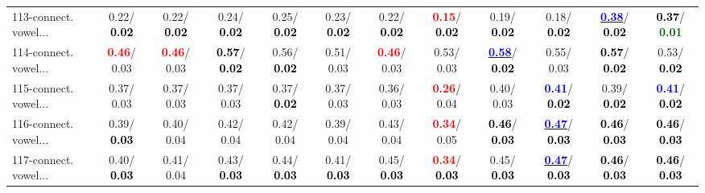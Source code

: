 \begin{table}[h]
\begin{center}
{\begin{tabular}{lc|c|c|c|c|c|c|c|c|c|c}
113-connect. vowel... &   0.22/\textcolor{black}{\textbf{  0.02}} &   0.22/\textcolor{black}{\textbf{  0.02}} &   0.24/\textcolor{black}{\textbf{  0.02}} &   0.25/\textcolor{black}{\textbf{  0.02}} &   0.23/\textcolor{black}{\textbf{  0.02}} &   0.22/\textcolor{black}{\textbf{  0.02}} & \textcolor{red}{\textbf{  0.15}}/\textcolor{black}{\textbf{  0.02}} &   0.19/\textcolor{black}{\textbf{  0.02}} &   0.18/\textcolor{black}{\textbf{  0.02}} & \underline{\textcolor{blue}{\textbf{  0.38}}}/\textcolor{black}{\textbf{  0.02}} & \textcolor{black}{\textbf{  0.37}}/\textcolor{darkgreen}{\textbf{  0.01}} \\
114-connect. vowel... & \textcolor{red}{\textbf{  0.46}}/  0.03 & \textcolor{red}{\textbf{  0.46}}/  0.03 & \textcolor{black}{\textbf{  0.57}}/\textcolor{black}{\textbf{  0.02}} &   0.56/\textcolor{black}{\textbf{  0.02}} &   0.51/  0.03 & \textcolor{red}{\textbf{  0.46}}/  0.03 &   0.53/  0.03 & \underline{\textcolor{blue}{\textbf{  0.58}}}/\textcolor{black}{\textbf{  0.02}} &   0.55/  0.03 & \textcolor{black}{\textbf{  0.57}}/\textcolor{black}{\textbf{  0.02}} &   0.53/\textcolor{black}{\textbf{  0.02}} \\
115-connect. vowel... &   0.37/  0.03 &   0.37/  0.03 &   0.37/  0.03 &   0.37/\textcolor{black}{\textbf{  0.02}} &   0.37/  0.03 &   0.36/  0.03 & \textcolor{red}{\textbf{  0.26}}/  0.04 &   0.40/  0.03 & \textcolor{blue}{\textbf{  0.41}}/\textcolor{black}{\textbf{  0.02}} &   0.39/\textcolor{black}{\textbf{  0.02}} & \textcolor{blue}{\textbf{  0.41}}/\textcolor{black}{\textbf{  0.02}} \\
116-connect. vowel... &   0.39/\textcolor{black}{\textbf{  0.03}} &   0.40/  0.04 &   0.42/  0.04 &   0.42/  0.04 &   0.39/  0.04 &   0.43/  0.04 & \textcolor{red}{\textbf{  0.34}}/  0.05 & \textcolor{black}{\textbf{  0.46}}/\textcolor{black}{\textbf{  0.03}} & \underline{\textcolor{blue}{\textbf{  0.47}}}/\textcolor{black}{\textbf{  0.03}} & \textcolor{black}{\textbf{  0.46}}/\textcolor{black}{\textbf{  0.03}} & \textcolor{black}{\textbf{  0.46}}/\textcolor{black}{\textbf{  0.03}} \\
117-connect. vowel... &   0.40/\textcolor{black}{\textbf{  0.03}} &   0.41/  0.04 &   0.43/\textcolor{black}{\textbf{  0.03}} &   0.44/\textcolor{black}{\textbf{  0.03}} &   0.41/\textcolor{black}{\textbf{  0.03}} &   0.45/\textcolor{black}{\textbf{  0.03}} & \textcolor{red}{\textbf{  0.34}}/\textcolor{black}{\textbf{  0.03}} &   0.45/\textcolor{black}{\textbf{  0.03}} & \underline{\textcolor{blue}{\textbf{  0.47}}}/\textcolor{black}{\textbf{  0.03}} & \textcolor{black}{\textbf{  0.46}}/\textcolor{black}{\textbf{  0.03}} & \textcolor{black}{\textbf{  0.46}}/\textcolor{black}{\textbf{  0.03}} \\ \hline

\end{tabular}}
\end{center}
\end{table}
